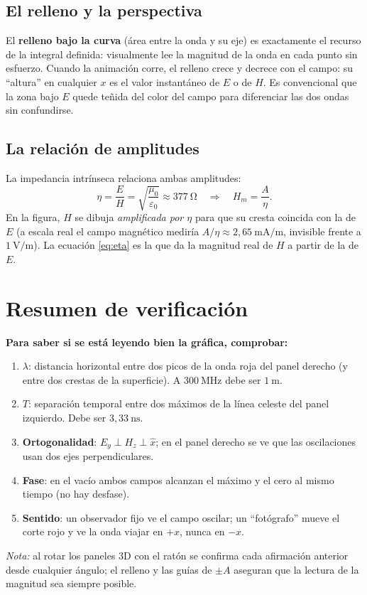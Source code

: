 \documentclass[11pt,a4paper]{article}
\begin{document}
\subsection{El relleno y la perspectiva}
El \textbf{relleno bajo la curva} (área entre la onda y su eje) es exactamente
el recurso de la integral definida: visualmente lee la magnitud de la onda en
cada punto sin esfuerzo. Cuando la animación corre, el relleno crece y decrece
con el campo: su “altura” en cualquier $x$ es el valor instantáneo de $E$ o de
$H$. Es convencional que la zona bajo $E$ quede teñida del color del campo para
diferenciar las dos ondas sin confundirse.

\subsection{La relación de amplitudes}
La impedancia intrínseca relaciona ambas amplitudes:
\begin{equation}
  \eta = \frac{E}{H} = \sqrt{\frac{\mu_0}{\varepsilon_0}} \approx 377\ \si{\ohm}
  \quad\Longrightarrow\quad
  H_m = \frac{A}{\eta}.
  \label{eq:eta}
\end{equation}
En la figura, $H$ se dibuja \emph{amplificada por $\eta$} para que su cresta
coincida con la de $E$ (a escala real el campo magnético mediría
$A/\eta \approx 2{,}65\ \si{\milli\ampere\per\metre}$, invisible frente a
$1\ \si{\volt\per\metre}$). La ecuación \eqref{eq:eta} es la que da la magnitud
real de $H$ a partir de la de $E$.

\section{Resumen de verificación}
\textbf{Para saber si se está leyendo bien la gráfica, comprobar:}
\begin{enumerate}[leftmargin=*, itemsep=2pt]
  \item \textbf{$\lambda$}: distancia horizontal entre dos picos de la onda
  roja del panel derecho (y entre dos crestas de la superficie). A
  $300\ \si{\mega\hertz}$ debe ser $1\ \si{\metre}$.
  \item \textbf{$T$}: separación temporal entre dos máximos de la línea celeste
  del panel izquierdo. Debe ser $3{,}33\ \si{\nano\second}$.
  \item \textbf{Ortogonalidad}: $E_y \perp H_z \perp \hat{x}$; en el panel
  derecho se ve que las oscilaciones usan dos ejes perpendiculares.
  \item \textbf{Fase}: en el vacío ambos campos alcanzan el máximo y el cero
  al mismo tiempo (no hay desfase).
  \item \textbf{Sentido}: un observador fijo ve el campo oscilar; un
  ``fotógrafo'' mueve el corte rojo y ve la onda viajar en $+x$, nunca en $-x$.
\end{enumerate}

\vspace{1em}
\noindent\emph{Nota:} al rotar los paneles 3D con el ratón se confirma cada
afirmación anterior desde cualquier ángulo; el relleno y las guías de $\pm A$
aseguran que la lectura de la magnitud sea siempre posible.
\end{document}
